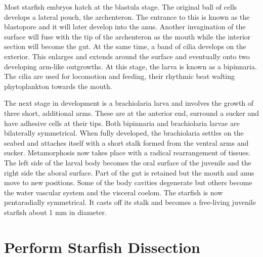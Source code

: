 \documentclass[]{book}
\theoremstyle{definition}
\theoremstyle{definition}
\theoremstyle{definition}
\theoremstyle{remark}
\begin{document}
Most starfish embryos hatch at the blastula stage. The original ball of
cells develops a lateral pouch, the archenteron. The entrance to this is
known as the blastopore and it will later develop into the anus. Another
invagination of the surface will fuse with the tip of the archenteron as
the mouth while the interior section will become the gut. At the same
time, a band of cilia develops on the exterior. This enlarges and
extends around the surface and eventually onto two developing arm-like
outgrowths. At this stage, the larva is known as a bipinnaria. The cilia
are used for locomotion and feeding, their rhythmic beat wafting
phytoplankton towards the mouth.

The next stage in development is a brachiolaria larva and involves the
growth of three short, additional arms. These are at the anterior end,
surround a sucker and have adhesive cells at their tips. Both bipinnaria
and brachiolaria larvae are bilaterally symmetrical. When fully
developed, the brachiolaria settles on the seabed and attaches itself
with a short stalk formed from the ventral arms and sucker.
Metamorphosis now takes place with a radical rearrangement of tissues.
The left side of the larval body becomes the oral surface of the
juvenile and the right side the aboral surface. Part of the gut is
retained but the mouth and anus move to new positions. Some of the body
cavities degenerate but others become the water vascular system and the
visceral coelom. The starfish is now pentaradially symmetrical. It casts
off its stalk and becomes a free-living juvenile starfish about 1 mm in
diameter.

\section{Perform Starfish Dissection}\label{perform-starfish-dissection}
\end{document}
